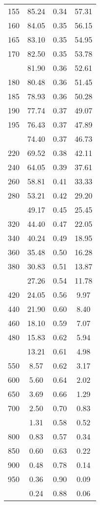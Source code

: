 \begin{table}[ht]
\begin{tabular}{lccc}
  155 & 85.24 & 0.34 & 57.31 \\ 
  160 & 84.05 & 0.35 & 56.15 \\ 
  165 & 83.10 & 0.35 & 54.95 \\ 
  170 & 82.50 & 0.35 & 53.78 \\ 
   \addlinespace
175 & 81.90 & 0.36 & 52.61 \\ 
  180 & 80.48 & 0.36 & 51.45 \\ 
  185 & 78.93 & 0.36 & 50.28 \\ 
  190 & 77.74 & 0.37 & 49.07 \\ 
  195 & 76.43 & 0.37 & 47.89 \\ 
   \addlinespace
200 & 74.40 & 0.37 & 46.73 \\ 
  220 & 69.52 & 0.38 & 42.11 \\ 
  240 & 64.05 & 0.39 & 37.61 \\ 
  260 & 58.81 & 0.41 & 33.33 \\ 
  280 & 53.21 & 0.42 & 29.20 \\ 
   \addlinespace
300 & 49.17 & 0.45 & 25.45 \\ 
  320 & 44.40 & 0.47 & 22.05 \\ 
  340 & 40.24 & 0.49 & 18.95 \\ 
  360 & 35.48 & 0.50 & 16.28 \\ 
  380 & 30.83 & 0.51 & 13.87 \\ 
   \addlinespace
400 & 27.26 & 0.54 & 11.78 \\ 
  420 & 24.05 & 0.56 & 9.97 \\ 
  440 & 21.90 & 0.60 & 8.40 \\ 
  460 & 18.10 & 0.59 & 7.07 \\ 
  480 & 15.83 & 0.62 & 5.94 \\ 
   \addlinespace
500 & 13.21 & 0.61 & 4.98 \\ 
  550 & 8.57 & 0.62 & 3.17 \\ 
  600 & 5.60 & 0.64 & 2.02 \\ 
  650 & 3.69 & 0.66 & 1.29 \\ 
  700 & 2.50 & 0.70 & 0.83 \\ 
   \addlinespace
750 & 1.31 & 0.58 & 0.52 \\ 
  800 & 0.83 & 0.57 & 0.34 \\ 
  850 & 0.60 & 0.63 & 0.22 \\ 
  900 & 0.48 & 0.78 & 0.14 \\ 
  950 & 0.36 & 0.90 & 0.09 \\ 
   \addlinespace
1000 & 0.24 & 0.88 & 0.06 \\ 
   \bottomrule
\end{tabular}
\end{table}
